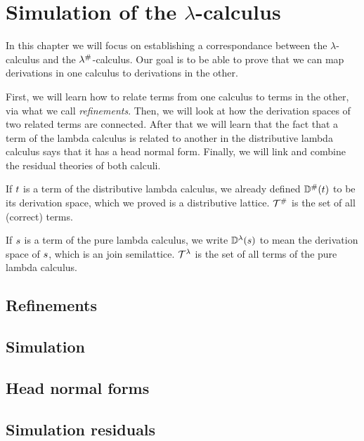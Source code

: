 
\chapter{Simulation of the $\lambda$-calculus}

In this chapter we will focus on establishing a correspondance between
the $\lambda$-calculus and the $\lambda^{\mathtt{\#}}$-calculus.
Our goal is to be able to prove that we can map derivations in one calculus
to derivations in the other.

First, we will learn how to relate terms from one calculus to terms in the other,
via what we call \emph{refinements}.
Then, we will look at how the derivation spaces of two related terms are connected.
After that we will learn that the fact that a term of the lambda calculus is
related to another in the distributive lambda calculus
says that it has a head normal form.
Finally, we will link and combine the residual theories of both calculi.


\begin{notation}
If $t$ is a term of the distributive lambda calculus,
we already defined $\mathbb{D}^{\mathtt{\#}}(t)$ to be its derivation space,
which we proved is a distributive lattice.
$\mathcal{T}^{\mathtt{\#}}$ is the set of all (correct) terms.

If $s$ is a term of the pure lambda calculus,
we write $\mathbb{D}^{\lambda}(s)$ to mean
the derivation space of $s$, which
is an join semilattice.
$\mathcal{T}^{\lambda}$ is the set of all terms of the pure lambda calculus.
\end{notation}


\section{Refinements}


\section{Simulation}


\section{Head normal forms}


\section{Simulation residuals}


